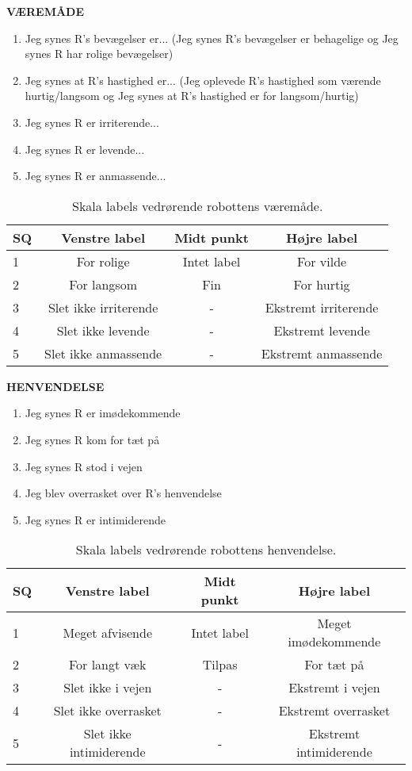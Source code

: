 \noindent
%
\textbf{VÆREMÅDE}
%
\begin{enumerate}
  \item Jeg synes R's bevægelser er... (Jeg synes R's bevægelser er behagelige og Jeg synes R har rolige bevægelser)
  \item Jeg synes at R's hastighed er... (Jeg oplevede R's hastighed som værende hurtig/langsom og Jeg synes at R's hastighed er for langsom/hurtig)
  \item Jeg synes R er irriterende...
  \item Jeg synes R er levende...
  \item Jeg synes R er anmassende...\blankline
\end{enumerate}
%
\begin{table}[H]
	\centering 
	\begin{tabular}{l|c|c|c}
		SQ     & Venstre label & Midt punkt & Højre label \\\hline
		1   & For rolige & Intet label & For vilde     \\\hline
		2   & For langsom & Fin & For hurtig   \\\hline
		3   & Slet ikke irriterende & - & Ekstremt irriterende \\\hline
	 	4   & Slet ikke levende & - & Ekstremt levende         \\\hline
		5   & Slet ikke anmassende & - & Ekstremt anmassende             
	\end{tabular}
	\caption{Skala labels vedrørende robottens væremåde.}
	\label{tab:VaeremaadeSkala}
\end{table}
\noindent
%
\textbf{HENVENDELSE}
%
\begin{enumerate}
  \item Jeg synes R er imødekommende
  \item Jeg synes R kom for tæt på
  \item Jeg synes R stod i vejen
  \item Jeg blev overrasket over R's henvendelse 
  \item Jeg synes R er intimiderende\\
\end{enumerate}
%
\begin{table}[H]
	\centering
	\begin{tabular}{l|c|c|c}
		SQ     & Venstre label & Midt punkt & Højre label \\\hline
		1   & Meget afvisende & Intet label & Meget imødekommende         \\\hline
		2   & For langt væk & Tilpas & For tæt på    \\\hline
		3   & Slet ikke i vejen & -  & Ekstremt i vejen  \\\hline
	 	4   & Slet ikke overrasket &  -  & Ekstremt overrasket \\\hline
		5   & Slet ikke intimiderende & - & Ekstremt intimiderende           
	\end{tabular}
	\caption{Skala labels vedrørende robottens henvendelse.}
	\label{tab:HenvendelseSkala} 
\end{table}
